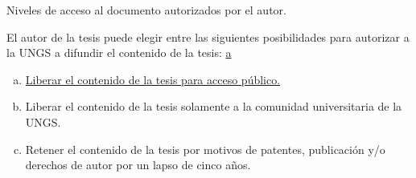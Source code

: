
\noindent Niveles de acceso al documento autorizados por el autor.

El autor de la tesis puede elegir entre las siguientes posibilidades para autorizar  a la UNGS a difundir el contenido de la tesis: \underline{a}
\begin{enumerate}[a)]
 	\item \underline{Liberar el contenido de la tesis para acceso público.}
 	\item Liberar el contenido de la tesis solamente a la comunidad universitaria de la UNGS.
 	\item Retener el contenido de la tesis por motivos de patentes, publicación y/o derechos de autor por un lapso de cinco años. 
 \end{enumerate}

